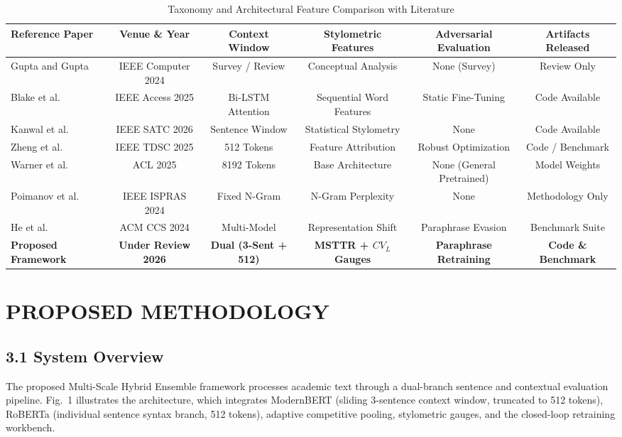 \documentclass[conference]{IEEEtran}
\begin{document}
\begin{table}[htbp]
\caption{Taxonomy and Architectural Feature Comparison with Literature}
\label{tab_taxonomy_comparison}
\centering
\begin{tabular}{lccccc}
\toprule
\textbf{Reference Paper} & \textbf{Venue \& Year} & \textbf{Context Window} & \textbf{Stylometric Features} & \textbf{Adversarial Evaluation} & \textbf{Artifacts Released} \\
\midrule
Gupta and Gupta \cite{gupta2024navigating} & IEEE Computer 2024 & Survey / Review & Conceptual Analysis & None (Survey) & Review Only \\
Blake et al. \cite{blake2025detection} & IEEE Access 2025 & Bi-LSTM Attention & Sequential Word Features & Static Fine-Tuning & Code Available \\
Kanwal et al. \cite{kanwal2026hybrid} & IEEE SATC 2026 & Sentence Window & Statistical Stylometry & None & Code Available \\
Zheng et al. \cite{zheng2025alertme} & IEEE TDSC 2025 & 512 Tokens & Feature Attribution & Robust Optimization & Code / Benchmark \\
Warner et al. \cite{warner2025modernbert} & ACL 2025 & 8192 Tokens & Base Architecture & None (General Pretrained) & Model Weights \\
Poimanov et al. \cite{poimanov2024ngram} & IEEE ISPRAS 2024 & Fixed N-Gram & N-Gram Perplexity & None & Methodology Only \\
He et al. \cite{he2024mgtbench} & ACM CCS 2024 & Multi-Model & Representation Shift & Paraphrase Evasion & Benchmark Suite \\
\textbf{Proposed Framework} & \textbf{Under Review 2026} & \textbf{Dual (3-Sent + 512)} & \textbf{MSTTR + $CV_L$ Gauges} & \textbf{Paraphrase Retraining} & \textbf{Code \& Benchmark} \\
\bottomrule
\end{tabular}
\end{table}


\section{PROPOSED METHODOLOGY}

\subsection{3.1 System Overview}
The proposed Multi-Scale Hybrid Ensemble framework processes academic text through a dual-branch sentence and contextual evaluation pipeline. Fig.~1 illustrates the architecture, which integrates ModernBERT (sliding 3-sentence context window, truncated to 512 tokens), RoBERTa (individual sentence syntax branch, 512 tokens), adaptive competitive pooling, stylometric gauges, and the closed-loop retraining workbench.
\end{document}
